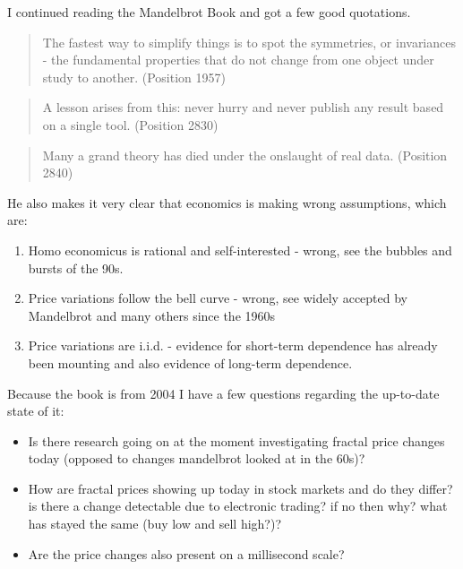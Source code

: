 \bigskip

I continued reading the Mandelbrot Book and got a few good quotations.

\begin{quote}
The fastest way to simplify things is to spot the symmetries, or invariances - the fundamental properties that do not change from one object under study to another. (Position 1957)
\end{quote}

\begin{quote}
A lesson arises from this: never hurry and never publish any result based on a single tool. (Position 2830)
\end{quote}

\begin{quote}
Many a grand theory has died under the onslaught of real data. (Position 2840)
\end{quote}

He also makes it very clear that economics is making wrong assumptions, which are:

\begin{enumerate}
\item Homo economicus is rational and self-interested - wrong, see the bubbles and bursts of the 90s.
\item Price variations follow the bell curve - wrong, see widely accepted by Mandelbrot and many others since the 1960s
\item Price variations are i.i.d. - evidence for short-term dependence has already been mounting and also evidence of long-term dependence.
\end{enumerate}

Because the book is from 2004 I have a few questions regarding the up-to-date state of it:

\begin{itemize}
\item Is there research going on at the moment investigating fractal price changes today (opposed to changes mandelbrot looked at in the 60s)?
\item How are fractal prices showing up today in stock markets and do they differ? is there a change detectable due to electronic trading? if no then why? what has stayed the same (buy low and sell high?)?
\item Are the price changes also present on a millisecond scale?
\end{itemize}

\bigskip

